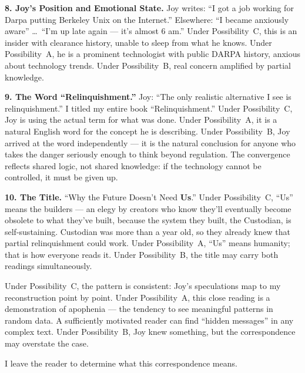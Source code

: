 \textbf{8. Joy's Position and Emotional State.} Joy writes: ``I got a job working for Darpa putting Berkeley Unix on the Internet.'' Elsewhere: ``I became anxiously aware'' \ldots\ ``I'm up late again --- it's almost 6 am.'' Under Possibility~C, this is an insider with clearance history, unable to sleep from what he knows. Under Possibility~A, he is a prominent technologist with public DARPA history, anxious about technology trends. Under Possibility~B, real concern amplified by partial knowledge.

\textbf{9. The Word ``Relinquishment.''} Joy: ``The only realistic alternative I see is relinquishment.'' I titled my entire book ``Relinquishment.'' Under Possibility~C, Joy is using the actual term for what was done. Under Possibility~A, it is a natural English word for the concept he is describing. Under Possibility~B, Joy arrived at the word independently --- it is the natural conclusion for anyone who takes the danger seriously enough to think beyond regulation. The convergence reflects shared logic, not shared knowledge: if the technology cannot be controlled, it must be given up.

\textbf{10. The Title.} ``Why the Future Doesn't Need \textbf{Us}.'' Under Possibility~C, ``Us'' means the builders --- an elegy by creators who know they'll eventually become obsolete to what they've built, because the system they built, the Custodian, is self-sustaining. Custodian was more than a year old, so they already knew that partial relinquishment could work. Under Possibility~A, ``Us'' means humanity; that is how everyone reads it. Under Possibility~B, the title may carry both readings simultaneously.

\vspace{0.5cm}

\noindent Under Possibility~C, the pattern is consistent: Joy's speculations map to my reconstruction point by point. Under Possibility~A, this close reading is a demonstration of apophenia --- the tendency to see meaningful patterns in random data. A sufficiently motivated reader can find ``hidden messages'' in any complex text. Under Possibility~B, Joy knew something, but the correspondence may overstate the case.

I leave the reader to determine what this correspondence means.

\chapterreturn
